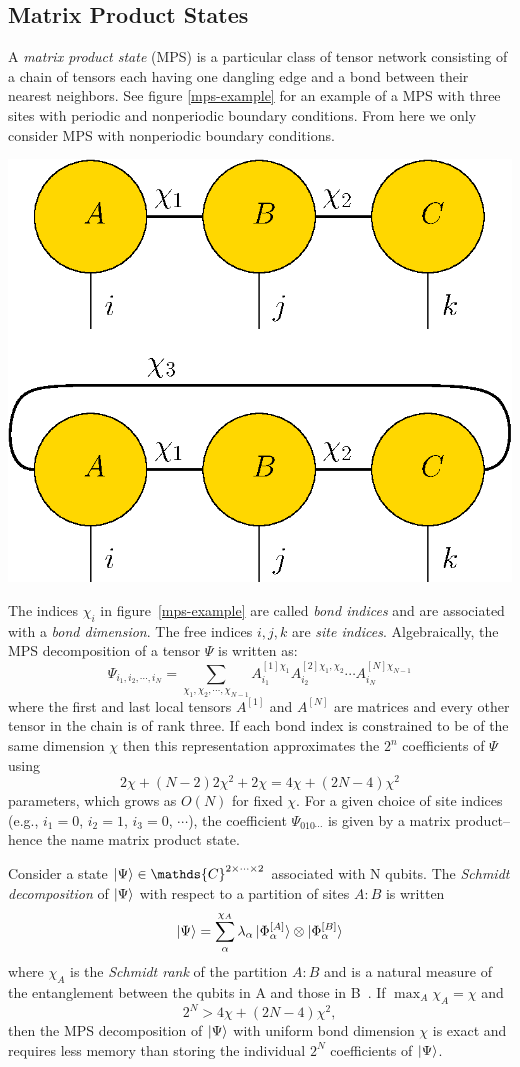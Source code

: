 \documentclass[12pt]{article}
\newenvironment{Figure}
  {\par\medskip\noindent\minipage{\linewidth}}
  {\endminipage\par\medskip}
\begin{document}
\begin{multicols}{2}
\section*{Matrix Product States}
	A \textit{matrix product state} (MPS) is a particular class
	of
	tensor network consisting of a chain of tensors each having one
	dangling edge and a bond between their nearest neighbors. See figure
	\ref{mps-example} for an example of a MPS with three sites with
	periodic and nonperiodic boundary conditions. From here we only
	consider MPS with nonperiodic boundary conditions.
	\begin{Figure}
		\center\includegraphics[width=.55\textwidth]{./Figures/mps-example.eps}
		\label{mps-example}
	\end{Figure}
	The indices $\chi_i$ in figure~\ref{mps-example} are called
	\textit{bond indices} and are associated with a
	\textit{bond dimension}. The free indices $i,j,k$ are
	\textit{site indices}. Algebraically, the MPS decomposition of a tensor $\Psi$ is written as:
	$$\Psi_{i_1,i_2,\cdots,i_N}=\sum_{\chi_1,\chi_2,\cdots,\chi_{N-1}}A^{[1]\chi_1}_{i_1}A_{i_2}^{[2]\chi_1,\chi_2}\cdots A^{[N]\chi_{N-1}}_{i_N}$$
	where the first and last local tensors $A^{[1]}$ and $A^{[N]}$ are
	matrices and every other tensor in the chain is of rank three. If
	each bond index is constrained to be of the same dimension $\chi$ then
	this representation approximates the $2^n$ coefficients of $\Psi$ using
	$$2\chi+(N-2)2\chi^2+2\chi=4\chi+(2N-4)\chi^2$$
	parameters, which grows as $O(N)$ for fixed $\chi$.
	For a given choice of site indices (e.g., $i_1=0$, $i_2=1$, $i_3=0$,
	$\cdots$), the coefficient $\Psi_{010\cdots}$ is given by a matrix
	product-- hence the name matrix product state.

	Consider a state $\ket{\Psi}\in\mathds{C}^{2\times\cdots\times2}$
	associated with N qubits.
	The \textit{Schmidt decomposition} of $\ket{\Psi}$ with respect to a
	partition of sites $A:B$ is written
	$$\ket{\Psi}=\sum_\alpha^{\chi_A}\lambda_\alpha\ket{\Phi_\alpha^{[A]}}\otimes\ket{\Phi_\alpha^{[B]}}$$
	where $\chi_A$ is the \textit{Schmidt rank} of the partition $A:B$
	and is a natural measure of the entanglement between the qubits in A
	and those in B~\cite{Vidal}. If $\max_A\chi_A=\chi$ and
	$$2^N>4\chi+(2N-4)\chi^2,$$
	then the MPS decomposition of $\ket{\Psi}$ with uniform bond
	dimension $\chi$ is exact and requires less memory than storing the
	individual $2^N$ coefficients of $\ket{\Psi}$.



\end{multicols}
\end{document}
